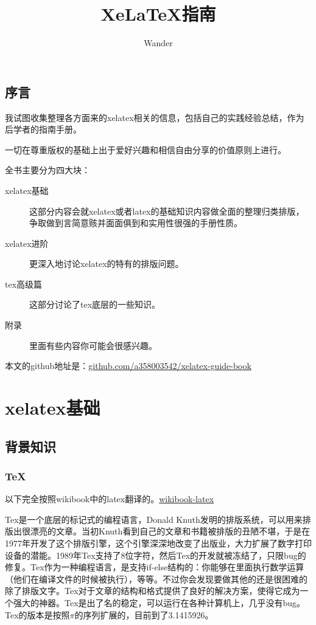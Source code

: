 \documentclass[12pt,oneside]{book}
\title{XeLaTeX指南}
\author{Wander}
\begin{document}
\makemytitle


\frontmatter 
{}
\chapter*{序言}
我试图收集整理各方面来的xelatex相关的信息，包括自己的实践经验总结，作为后学者的指南手册。

一切在尊重版权的基础上出于爱好兴趣和相信自由分享的价值原则上进行。

全书主要分为四大块：
\begin{description}
\item[xelatex基础] 这部分内容会就xelatex或者latex的基础知识内容做全面的整理归类排版，争取做到言简意赅并面面俱到和实用性很强的手册性质。

\item[xelatex进阶] 更深入地讨论xelatex的特有的排版问题。

\item[tex高级篇] 这部分讨论了tex底层的一些知识。

\item[附录] 里面有些内容你可能会很感兴趣。
\end{description}


本文的github地址是：\href{https://github.com/a358003542/xelatex-guide-book}{github.com/a358003542/xelatex-guide-book}



\setcounter{tocdepth}{2}    
\tableofcontents


\mainmatter 
\part{xelatex基础}
\chapter{背景知识}
\section{TeX}
以下完全按照wikibook中的latex翻译的。\href{http://en.wikibooks.org/wiki/LaTeX/Introduction}{wikibook-latex}

Tex是一个底层的标记式的编程语言，Donald Knuth发明的排版系统，可以用来排版出很漂亮的文章。当初Knuth看到自己的文章和书籍被排版的丑陋不堪，于是在1977年开发了这个排版引擎，这个引擎深深地改变了出版业，大力扩展了数字打印设备的潜能。1989年Tex支持了8位字符，然后Tex的开发就被冻结了，只限bug的修复。Tex作为一种编程语言，是支持if-else结构的：你能够在里面执行数学运算（他们在编译文件的时候被执行），等等。不过你会发现要做其他的还是很困难的除了排版文字。Tex对于文章的结构和格式提供了良好的解决方案，使得它成为一个强大的神器。Tex是出了名的稳定，可以运行在各种计算机上，几乎没有bug。Tex的版本是按照$\pi$的序列扩展的，目前到了3.1415926。
\end{document}
